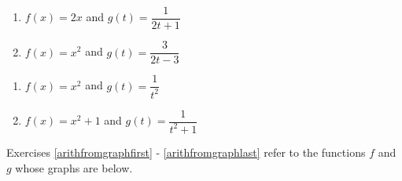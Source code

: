 \begin{multicols}{2}
\begin{enumerate}
\setcounter{enumi}{\value{HW}}

\item  $f(x) = 2x$ and  $g(t) = \dfrac{1}{2t+1}$
\item  $f(x) = x^2$ and $g(t) = \dfrac{3}{2t-3}$

\setcounter{HW}{\value{enumi}}
\end{enumerate}
\end{multicols}

\begin{multicols}{2}
\begin{enumerate}
\setcounter{enumi}{\value{HW}}

\item  $f(x) = x^2$ and  $g(t) = \dfrac{1}{t^2}$
\item  $f(x) = x^2+1$ and $g(t) = \dfrac{1}{t^2+1}$ \label{basicarithonelast}

\setcounter{HW}{\value{enumi}}
\end{enumerate}
\end{multicols}



Exercises \ref{arithfromgraphfirst} - \ref{arithfromgraphlast} refer to the functions $f$ and $g$ whose graphs are below. 

